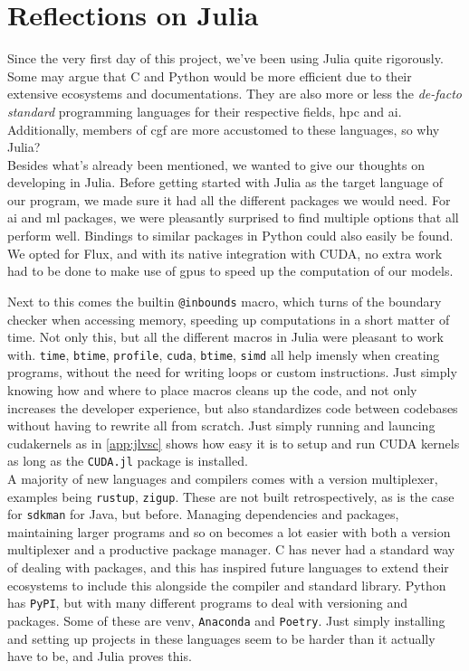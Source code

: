 \section*{Reflections on Julia}
\label{sec:juliaref}

Since the very first day of this project, we've been using Julia quite rigorously. Some may argue that C and Python would be more efficient due to their extensive ecosystems and documentations. They are also more or less the \textit{de-facto standard} programming languages for their respective fields, \acrshort{hpc} and \acrshort{ai}. Additionally, members of \acrshort{cgf} are more accustomed to these languages, so why Julia? \\

Besides what's already been mentioned, we wanted to give our thoughts on developing in Julia. Before getting started with Julia as the target language of our program, we made sure it had all the different packages we would need. For \acrshort{ai} and \acrshort{ml} packages, we were pleasantly surprised to find multiple options that all perform well. Bindings to similar packages in Python could also easily be found. We opted for Flux, and with its native integration with CUDA, no extra work had to be done to make use of \acrshort{gpu}s to speed up the computation of our models.

Next to this comes the builtin \texttt{@inbounds} macro, which turns of the boundary checker when accessing memory, speeding up computations in a short matter of time. Not only this, but all the different macros in Julia were pleasant to work with. \texttt{time}, \texttt{btime}, \texttt{profile}, \texttt{cuda}, \texttt{btime}, \texttt{simd} all help imensly when creating programs, without the need for writing loops or custom instructions. Just simply knowing how and where to place macros cleans up the code, and not only increases the developer experience, but also standardizes code between codebases without having to rewrite all from scratch. Just simply running and launcing cudakernels as in \ref{app:jlvsc} shows how easy it is to setup and run CUDA kernels as long as the \texttt{CUDA.jl} package is installed. \\

A majority of new languages and compilers comes with a version multiplexer, examples being \texttt{rustup}, \texttt{zigup}. These are not built retrospectively, as is the case for \texttt{sdkman} for Java, but before. Managing dependencies and packages, maintaining larger programs and so on becomes a lot easier with both a version multiplexer and a productive package manager. C has never had a standard way of dealing with packages, and this has inspired future languages to extend their ecosystems to include this alongside the compiler and standard library. Python has \texttt{PyPI}, but with many different programs to deal with versioning and packages. Some of these are venv, \texttt{Anaconda} and \texttt{Poetry}. Just simply installing and setting up projects in these languages seem to be harder than it actually have to be, and Julia proves this. \\ 

